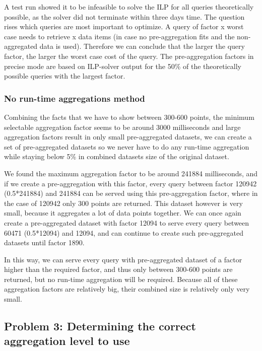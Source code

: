 A test run showed it to be infeasible to solve the ILP for all queries theoretically possible, as the solver did not terminate within three days time. The question rises which queries are most important to optimize. A query of factor x worst case needs to retrieve x data items (in case no pre-aggregation fits and the non-aggregated data is used). Therefore we can conclude that the larger the query factor, the larger the worst case cost of the query. The pre-aggregation factors in precise mode are based on ILP-solver output for the 50\% of the theoretically possible queries with the largest factor. 

\subsubsection{No run-time aggregations method}
Combining the facts that we have to show between 300-600 points, the minimum selectable aggregation factor seems to be around 3000 milliseconds and large aggregation factors result in only small pre-aggregated datasets, we can create a set of pre-aggregated datasets so we never have to do any run-time aggregation while staying below 5\% in combined datasets size of the original dataset.

We found the maximum aggregation factor to be around 241884 milliseconds, and if we create a pre-aggregation with this factor, every query between factor 120942 (0.5*241884) and 241884 can be served using this pre-aggregation factor, where in the case of 120942 only 300 points are returned. This dataset however is very small, because it aggregates a lot of data points together. We can once again create a pre-aggregated dataset with factor 12094 to serve every query between 60471 (0.5*12094) and 12094, and can continue to create such pre-aggregated datasets until factor 1890. 

In this way, we can serve every query with pre-aggregated dataset of a factor higher than the required factor, and thus only between 300-600 points are returned, but no run-time aggregation will be required. Because all of these aggregation factors are relatively big, their combined size is relatively only very small.

\subsection{Problem 3: Determining the correct aggregation level to use}

